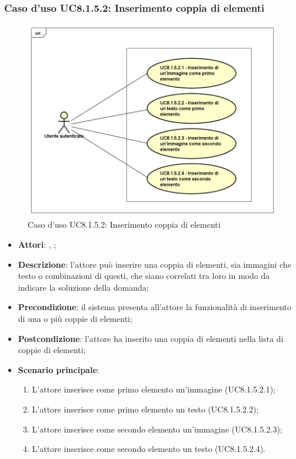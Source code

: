 	\subsubsection{Caso d'uso UC8.1.5.2: Inserimento coppia di elementi}
	\begin{figure}[h]
		\centering
		\includegraphics[scale=0.5,keepaspectratio]{UML/UC8_1_5_2.png}
		\caption{Caso d'uso UC8.1.5.2: Inserimento coppia di elementi}
	\end{figure}
	\FloatBarrier
	\begin{itemize}
		\item \textbf{Attori}: \uau, \uaupro;
		\item \textbf{Descrizione}: l'attore può inserire una coppia di elementi, sia immagini che testo o combinazioni di questi, che siano correlati tra loro in modo da indicare la soluzione della domanda; 
		\item \textbf{Precondizione}: il sistema presenta all'attore la funzionalità di inserimento di una o più coppie di elementi;
		\item \textbf{Postcondizione}: l'attore ha inserito una coppia di elementi nella lista di coppie di elementi; 
		\item \textbf{Scenario principale}: 
		\begin{enumerate}
			\item L'attore inserisce come primo elemento un'immagine (UC8.1.5.2.1);
			\item L'attore inserisce come primo elemento un testo (UC8.1.5.2.2);
			\item L'attore inserisce come secondo elemento un'immagine (UC8.1.5.2.3);
			\item L'attore inserisce come secondo elemento un testo (UC8.1.5.2.4).	
		\end{enumerate}
	\end{itemize}
	
